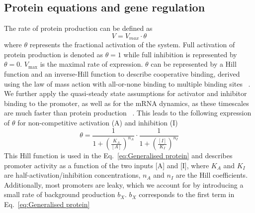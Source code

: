 \subsection{Protein equations and gene regulation}\label{Protein equations and gene regulation}
The rate of protein production can be defined as
\begin{equation}
    V = V_{max} \cdot \theta
    \label{eq: vmax}
\end{equation}
where $\theta$ represents the fractional activation of the system. Full activation of protein production is denoted as $\theta=1$ while full inhibition is represented by $\theta=0$.
$V_{\max}$ is the maximal rate of expression.
$\theta$ can be represented by a Hill function and an inverse-Hill function to describe cooperative binding, derived using the law of mass action with all-or-none binding to multiple binding sites ~\parencite{Weiss1997}.
We further apply the quasi-steady state assumptions for activator and inhibitor binding to the promoter, as well as for the mRNA dynamics, as these timescales are much faster than protein production ~\parencite{Andersen1998, Bremer2008}.
This leads to the following expression of $\theta$ for non-competitive activation (A) and inhibition (I)
\begin{equation}
    \theta= \frac{1}{1+\left(\frac{K_{A}}{[A]}\right)^{n_{A}}} \cdot \frac{1}{1+\left(\frac{[I]}{K_{I}}\right)^{n_{I}}}
    \label{eq:theta}
\end{equation}
This Hill function is used in the Eq.~\ref{eq:Generalised protein} and describes promoter activity as a function of the two inputs [A] and [I], where $K_{A}$ and $K_{I}$ are half-activation/inhibition concentrations, $n_{A}$ and $n_{I}$ are the Hill coefficients.
Additionally, most promoters are leaky, which we account for by introducing a small rate of background production $b_{X}$. $b_{X}$ corresponds to the first term in Eq.~\ref{eq:Generalised protein}

